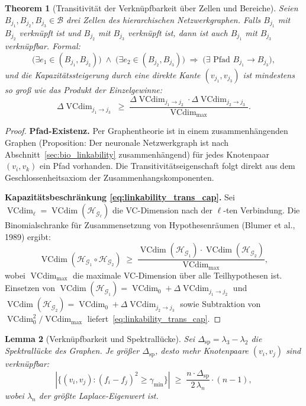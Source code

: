 ﻿\documentclass[12pt, a4paper, openany]{report}
\newtheorem{theorem}{Theorem}[chapter]
\newtheorem{lemma}[theorem]{Lemma}
\newcommand{\calG}{\mathcal{G}}
\newcommand{\calH}{\mathcal{H}}
\newcommand{\calB}{\mathcal{B}}
\DeclareMathOperator{\VC}{VCdim}
\begin{document}
\begin{theorem}[Transitivität der Verknüpfbarkeit über Zellen und Bereiche]
\label{thm:linkability_transitivity}
Seien $B_{j_1}, B_{j_2}, B_{j_3} \in \calB$ drei Zellen des hierarchischen
Netzwerkgraphen.  Falls $B_{j_1}$ mit $B_{j_2}$ verknüpft ist und
$B_{j_2}$ mit $B_{j_3}$ verknüpft ist, dann ist auch $B_{j_1}$ mit $B_{j_3}$
verknüpfbar.  Formal:
\begin{equation}
  \label{eq:linkability_transitivity}
  \bigl(\exists e_1 \in (B_{j_1}, B_{j_2})\bigr)
  \;\wedge\;
  \bigl(\exists e_2 \in (B_{j_2}, B_{j_3})\bigr)
  \;\Rightarrow\;
  \bigl(\exists \text{ Pfad } B_{j_1} \to B_{j_3}\bigr),
\end{equation}
und die Kapazitätssteigerung durch eine direkte Kante $(v_{j_1}, v_{j_3})$
ist mindestens so groß wie das Produkt der Einzelgewinne:
\begin{equation}
  \label{eq:linkability_trans_cap}
  \Delta\VC_{j_1 \to j_3}
  \;\geq\;
  \frac{\Delta\VC_{j_1 \to j_2} \cdot \Delta\VC_{j_2 \to j_3}}
       {\VC_{\max}}.
\end{equation}
\end{theorem}

\begin{proof}
\textbf{Pfad-Existenz.}
Per Graphentheorie ist in einem zusammenhängenden Graphen (Proposition:
Der neuronale Netzwerkgraph ist nach Abschnitt~\ref{sec:bio_linkability}
zusammenhängend) für jedes Knotenpaar $(v_{i}, v_{k})$ ein Pfad vorhanden.
Die Transitivitätseigenschaft folgt direkt aus dem Geschlossenheitsaxiom
der Zusammenhangskomponenten.

\textbf{Kapazitätsbeschränkung \eqref{eq:linkability_trans_cap}.}
Sei $\VC_\ell = \VC(\calH_{\calG_\ell})$ die VC-Dimension nach der
$\ell$-ten Verbindung.  Die Binomialschranke für Zusammensetzung von
Hypothesenräumen (Blumer et al., 1989) ergibt:
\[
  \VC(\calH_{\calG_1} \circ \calH_{\calG_2})
  \;\geq\;
  \frac{\VC(\calH_{\calG_1}) \cdot \VC(\calH_{\calG_2})}{\VC_{\max}},
\]
wobei $\VC_{\max}$ die maximale VC-Dimension über alle Teilhypothesen ist.
Einsetzen von $\VC(\calH_{\calG_1}) = \VC_0 + \Delta\VC_{j_1 \to j_2}$
und $\VC(\calH_{\calG_2}) = \VC_0 + \Delta\VC_{j_2 \to j_3}$ sowie
Subtraktion von $\VC_0^2 / \VC_{\max}$ liefert~\eqref{eq:linkability_trans_cap}.
\end{proof}

\begin{lemma}[Verknüpfbarkeit und Spektrallücke]
\label{lem:linkability_gap}
Sei $\Delta_{\mathrm{sp}} = \lambda_3 - \lambda_2$ die Spektrallücke des
Graphen.  Je größer $\Delta_{\mathrm{sp}}$, desto mehr Knotenpaare
$(v_i, v_j)$ sind verknüpfbar:
\begin{equation}
  \label{eq:linkability_gap_bound}
  |\{(v_i, v_j) : (f_i - f_j)^2 \geq \gamma_{\min}\}|
  \;\geq\;
  \frac{n \cdot \Delta_{\mathrm{sp}}}{2\,\lambda_n} \cdot (n-1),
\end{equation}
wobei $\lambda_n$ der größte Laplace-Eigenwert ist.
\end{lemma}
\end{document}
